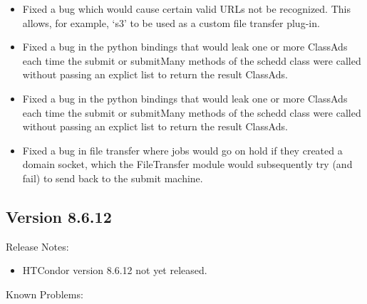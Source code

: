\begin{itemize}

\item Fixed a bug which would cause certain valid URLs not be recognized.  This
allows, for example, `s3' to be used as a custom file transfer plug-in.

\item Fixed a bug in the python bindings that would leak one or more ClassAds each time
the submit or submitMany methods of the schedd class were called without passing an explict list to
return the result ClassAds.

\item Fixed a bug in the python bindings that would leak one or more ClassAds each time
the submit or submitMany methods of the schedd class were called without passing an explict list to
return the result ClassAds.

\item Fixed a bug in file transfer where jobs would go on hold if they created
a domain socket, which the FileTransfer module would subsequently try (and fail) 
to send back to the submit machine.

\end{itemize}

\subsection*{\label{sec:New-8-6-12}Version 8.6.12}

\noindent Release Notes:

\begin{itemize}

\item HTCondor version 8.6.12 not yet released.

\end{itemize}

\noindent Known Problems:

